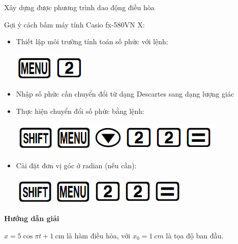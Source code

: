 \begin{dang}{Xây dựng được phương trình dao động điều hòa}
{		Gợi ý cách bấm máy tính Casio fx-580VN X:
		\begin{itemize}
			\item Thiết lập môi trường tính toán số phức với lệnh:
			\begin{center}
				\includegraphics[scale=0.5]{../figs/VN12-PH-02-A-001-1-V2-5.jpg}
			\end{center}
			\item Nhập số phức cần chuyển đổi từ dạng Descartes sang dạng lượng giác
			\item Thực hiện chuyển đổi số phức bằng lệnh:
			\begin{center}
				\includegraphics[scale=0.5]{../figs/VN12-PH-02-A-001-1-V2-6.jpg}
			\end{center}
			\item Cài đặt đơn vị góc ở radian (nếu cần):
			\begin{center}
				\includegraphics[scale=0.5]{../figs/VN12-PH-02-A-001-1-V2-7.jpg}
			\end{center}
		\end{itemize}	
	}
	{\begin{center}
			\textbf{Hướng dẫn giải}
		\end{center}
		
		$x=5\cos \pi t + 1\ \text{cm}$ là hàm điều hòa, với $x_0 =\SI{1}{cm}$ là tọa độ ban đầu.
		
}
\end{dang}
